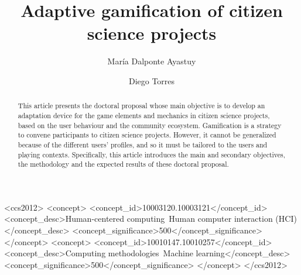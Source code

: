 \documentclass[sigconf]{acmart}
\begin{document}
\title{Adaptive gamification of citizen science projects}


\author{María Dalponte Ayastuy}




\author{Diego Torres}




\renewcommand{\shortauthors}{Dalponte and Torres}
\begin{abstract}
This article presents the doctoral proposal whose main objective is to develop an adaptation device for the game elements and mechanics in citizen science projects, based on the user behaviour and the community ecosystem.  Gamification is a strategy to convene participants to citizen science projects. However, it cannot be  generalized  because  of  the  different  users’  profiles,  and  so  it  must be tailored to the users and playing contexts. Specifically, this article introduces the main and secondary objectives, the methodology and the expected results of these doctoral proposal.
\end{abstract}


\begin{CCSXML}
	<ccs2012>
	<concept>
	<concept_id>10003120.10003121</concept_id>
	<concept_desc>Human-centered computing~Human computer interaction (HCI)</concept_desc>
	<concept_significance>500</concept_significance>
	</concept>
	<concept>
	<concept_id>10010147.10010257</concept_id>
	<concept_desc>Computing methodologies~Machine learning</concept_desc>
	<concept_significance>500</concept_significance>
	</concept>
	</ccs2012>
\end{CCSXML}
\end{document}
